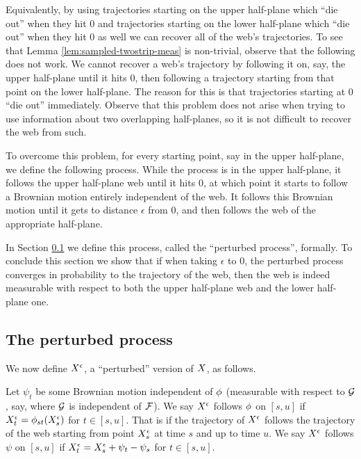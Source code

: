 {Equivalently, by using trajectories starting on the upper half-plane
which ``die out'' when they hit $0$ and trajectories starting on
the lower half-plane which ``die out'' when they hit $0$ as well we
can recover all of the web's trajectories.
To see that Lemma \ref{lem:sampled-twostrip-meas} is non-trivial,
observe that the following does not work. We cannot recover a web's
trajectory by following it on, say, the upper half-plane until it
hits 0, then following a trajectory starting from that point on the
lower half-plane. The reason for this is that trajectories starting at
0 ``die out'' immediately. Observe that this problem does not arise when
trying to use information about two overlapping half-planes, so it is
not difficult to recover the web from such.

To overcome this problem, for every starting point, say in the upper
half-plane, we define the following process. While the process is in
the upper half-plane, it follows the upper half-plane web until it hits
$0$, at which point it starts to follow a Brownian motion entirely
independent of the web. It follows this Brownian motion until it gets
to distance $\epsilon$ from 0, and then follows the web of the appropriate
half-plane.

In Section \ref{subsec:the-perturbed-process} we define this process, called the
``perturbed process'', formally.
To conclude this section we show that if when taking $\epsilon$
to 0, the perturbed process converges in probability to the trajectory of
the web, then the web is indeed measurable with respect
to both the upper half-plane web and the lower half-plane one.

\subsection{The perturbed process}
\label{subsec:the-perturbed-process}

\newcommand{\statewebO}{S_{\webnoargs}}
\newcommand{\statenowebO}{S_{\indepbm}}

{
\newcommand{\joinernoargs}{\psi}
\newcommand{\joiner}[2]{\joinernoargs_{{#1}{#2}}}
\newcommand{\joinerval}[1]{\joinernoargs_{#1}}
\begin{definition}
  \label{def:resamplede}
  We now define $X^{\epsilon}$, a ``perturbed'' version of $X$, as
  follows.

  Let $\joinerval{t}$ be
  some Brownian motion independent of $\phi$ (measurable with
  respect to $\mathcal{G}$, say, where $\mathcal{G}$ is independent of
  $\mathcal{F}$).
  We say $X^{\epsilon}$ follows $\phi$ on $[s,u]$ if
  $X^{\epsilon}_t = \phi_{{s}{t}}(X^{\epsilon}_s)$ for $t \in [s,u]$.
  That is if the trajectory of $X^{\epsilon}$ follows the trajectory of
  the web starting from point $X^{\epsilon}_s$ at time $s$ and up to time $u$.
  We say $X^{\epsilon}$ follows $\joinernoargs$ on $[s,u]$ if
  $\resamplede_t = \resamplede_s + \joinerval{t} - \joinerval{s}$ for $t \in [s,u]$.


\end{definition}}}

